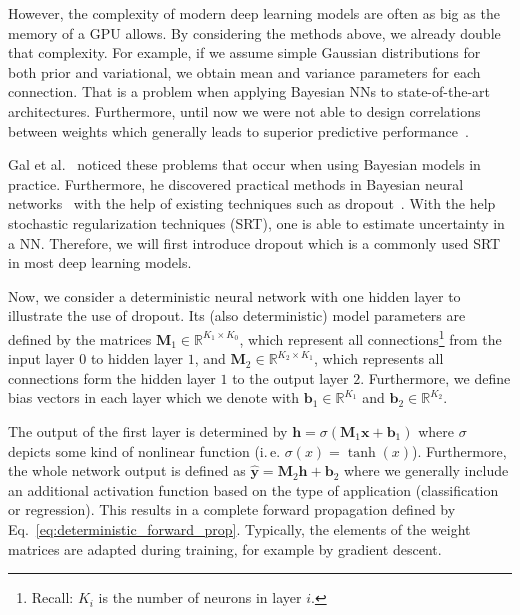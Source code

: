 \documentclass[runningheads]{llncs}
\begin{document}
However, the complexity of modern deep learning models are often as big as the memory of a GPU allows.
By considering the methods above, we already double that complexity.
For example, if we assume simple Gaussian distributions for both prior and variational, we obtain mean and variance parameters for each connection.
That is a problem when applying Bayesian NNs to state-of-the-art architectures.
Furthermore, until now we were not able to design correlations between weights which generally leads to superior predictive performance~\cite{krizhevsky2012imagenet}.

Gal et al.~\cite{Gal2016Uncertainty} noticed these problems that occur when using Bayesian models in practice. 
Furthermore, he discovered practical methods in Bayesian neural networks~\cite{Gal2016Dropout} with the help of existing techniques such as dropout~\cite{Srivastava:2014:DSW:2627435.2670313}.
With the help stochastic regularization techniques (SRT), one is able to estimate uncertainty in a NN.
Therefore, we will first introduce dropout which is a commonly used SRT in most deep learning models.

Now, we consider a deterministic neural network with one hidden layer to illustrate the use of dropout.
Its (also deterministic) model parameters are defined by the matrices $\mathbf{M}_1 \in \mathbb{R}^{K_1\times K_0}$, which represent all connections\footnote{Recall: $K_i$ is the number of neurons in layer $i$.} from the input layer $0$ to hidden layer  $1$, and $\mathbf{M}_2 \in \mathbb{R}^{K_2\times K_1}$, which represents all connections form the hidden layer $1$ to the output layer $2$.
Furthermore, we define bias vectors in each layer which we denote with $\mathbf{b}_1 \in \mathbb{R}^{K_1}$ and $\mathbf{b}_2\in \mathbb{R}^{K_2}$.

The output of the first layer is determined by $\mathbf{h} = \sigma \left(\mathbf{M}_1\mathbf{x} + \mathbf{b}_1\right)$ where $\sigma$ depicts some kind of nonlinear function (i.\,e. $\sigma(x) = \tanh(x)$).
Furthermore, the whole network output is defined as $\hat{\mathbf{y}} = \mathbf{M}_2\mathbf{h} + \mathbf{b}_2$ where we generally include an additional activation function based on the type of application (classification or regression).
This results in a complete forward propagation defined by Eq.~\ref{eq:deterministic_forward_prop}.
Typically, the elements of the weight matrices are adapted during training, for example by gradient descent.
\end{document}
